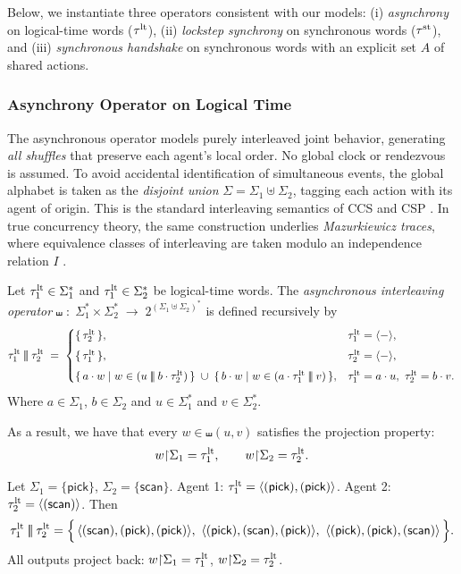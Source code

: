 \documentclass{article}
\begin{document}
  Below, we instantiate three operators consistent with our models:
  (i) \emph{asynchrony} on logical-time words (\(\tau^{\mathrm{lt}}\)),
  (ii) \emph{lockstep synchrony} on synchronous words (\(\tau^{\mathrm{st}}\)),
  and (iii) \emph{synchronous handshake} on synchronous words with an explicit set \(A\) of shared actions.
  
  \subsubsection{Asynchrony Operator on Logical Time}
  The asynchronous operator models purely interleaved joint behavior, generating 
  \emph{all shuffles} that preserve each agent’s local order. 
  No global clock or rendezvous is assumed. 
  To avoid accidental identification of simultaneous events, the global alphabet is taken as the 
  \emph{disjoint union} $\Sigma=\Sigma_1\uplus\Sigma_2$, tagging each action with its agent of origin. 
  This is the standard interleaving semantics of CCS and CSP \cite{Milner89,Hoare85}. 
  In true concurrency theory, the same construction underlies \emph{Mazurkiewicz traces}, 
  where equivalence classes of interleaving are taken modulo an independence relation $I$ 
  \cite{DiekertRozenberg95}.
  
  \begin{definition}
  Let $\tau^{\mathrm{lt}}_1\in\Sigma_1^{*}$ and $\tau^{\mathrm{lt}}_1\in\Sigma_2^{*}$ be logical-time words. 
  The \emph{asynchronous interleaving operator} 
  $
  \shuffle \;:\; \Sigma_1^{*}\times \Sigma_2^{*}\;\longrightarrow\; 2^{(\Sigma_1\uplus\Sigma_2)^{*}}
  $
  is defined recursively by
  \[
  \tau^{\mathrm{lt}}_1 \mathbin{|\!|\!|} \tau^{\mathrm{lt}}_2 \;=\;
  \begin{cases}
  \{\,\tau^{\mathrm{lt}}_2\,\}, & \tau^{\mathrm{lt}}_1=\langle - \rangle ,\\[4pt]
  \{\,\tau^{\mathrm{lt}}_1\,\}, & \tau^{\mathrm{lt}}_2=\langle - \rangle ,\\[4pt]
  \{\,a\cdot w \mid w\in (u\mathbin{|\!|\!|} b\cdot \tau^{\mathrm{lt}}_2)\,\}
  \;\cup\;
  \{\,b\cdot w \mid w\in (a\cdot \tau^{\mathrm{lt}}_1 \mathbin{|\!|\!|} v)\,\},
  & \tau^{\mathrm{lt}}_1=a\cdot u,\ \tau^{\mathrm{lt}}_2=b\cdot v.
  \end{cases}
  \]
  Where $a\in\Sigma_1$, $b\in\Sigma_2$ and $u \in \Sigma_1^*$ and $v \in \Sigma_2^*$.
  \end{definition}
  
  \noindent As a result, we have that every $w\in \shuffle(u,v)$ satisfies the projection property:
  \[
  w{\upharpoonright}\Sigma_1=\tau^{\mathrm{lt}}_1,\qquad w{\upharpoonright}\Sigma_2=\tau^{\mathrm{lt}}_2.
  \]
  
  
  \begin{example}
  Let \(\Sigma_1=\{\textsf{pick}\}\), \(\Sigma_2=\{\textsf{scan}\}\).
  Agent 1: \(\tau^{\mathrm{lt}}_1=\langle (\textsf{pick}),(\textsf{pick}) \rangle \).
  Agent 2: \(\tau^{\mathrm{lt}}_2=\langle (\textsf{scan}) \rangle \).
  Then
  \[
  \tau^{\mathrm{lt}}_1 \mathbin{|\!|\!|} \tau^{\mathrm{lt}}_2 =
  \Big\{\,
  \langle (\textsf{scan}),(\textsf{pick}),(\textsf{pick}) \rangle ,\
  \langle (\textsf{pick}),(\textsf{scan}),(\textsf{pick}) \rangle ,\
  \langle (\textsf{pick}),(\textsf{pick}),(\textsf{scan}) \rangle 
  \,\Big\}.
  \]
  All outputs project back: \(w{\upharpoonright}\Sigma_1=\tau^{\mathrm{lt}}_1\), \(w{\upharpoonright}\Sigma_2=\tau^{\mathrm{lt}}_2\).
  \end{example}
  
\end{document}

